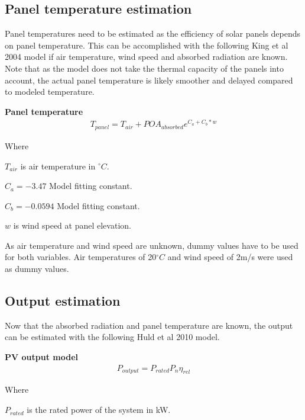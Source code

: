 \subsection{Panel temperature estimation}
Panel temperatures need to be estimated as the efficiency of solar panels depends on panel temperature. This can be accomplished with the following King et al 2004 model\cite{king2004} if air temperature, wind speed and absorbed radiation are known. Note that as the model does not take the thermal capacity of the panels into account, the actual panel temperature is likely smoother and delayed compared to modeled temperature.

\noindent\textbf{Panel temperature}
\begin{equation}
\begin{split}
\label{panel_temp}
T_{panel} = T_{air} + POA_{absorbed} e ^{C_a+ C_b*w}
\end{split}
\end{equation}

\noindent Where 

$T_{air}$ is air temperature in $^\circ C$.

$C_a = -3.47$ Model fitting constant.

$C_b = -0.0594$ Model fitting constant. 

$w$ is wind speed at panel elevation.


\vspace{6mm}

\noindent As air temperature and wind speed are unknown, dummy values have to be used for both variables. Air temperatures of 20$^\circ C$ and wind speed of 2m/s were used as dummy values.

\newpage
\subsection{Output estimation}
Now that the absorbed radiation and panel temperature are known, the output can be estimated with the following Huld et al 2010 model\cite{huld2010}.

\noindent\textbf{PV output model}
\begin{equation}
\begin{split}
\label{pv_output_model}
P_{output} = P_{rated}  P_n  \eta_{rel}
\end{split}
\end{equation}

\noindent Where 

$P_{rated}$ is the rated power of the system in kW.

